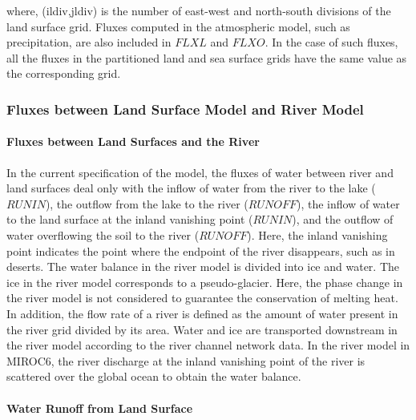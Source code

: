 where, (ildiv,jldiv) is the number of east-west and north-south divisions of the land surface grid. Fluxes computed in the atmospheric model, such as precipitation, are also included in \(FLXL\) and
\(FLXO\). In the case of such fluxes, all the fluxes in the partitioned land and sea surface grids have the same value as the corresponding grid.

\hypertarget{fluxes-between-land-surface-model-and-river-model}{%
\subsubsection{Fluxes between Land Surface Model and River Model}\label{fluxes-between-land-surface-model-and-river-model}}

\hypertarget{fluxes-between-land-surfaces-and-the-river}{%
\paragraph{Fluxes between Land Surfaces and the River}\label{fluxes-between-land-surfaces-and-the-river}}

In the current specification of the model, the fluxes of water between river and land surfaces deal only with the inflow of water from the river to the lake (\(RUNIN\)), the outflow from the lake to
the river (\(RUNOFF\)), the inflow of water to the land surface at the inland vanishing point (\(RUNIN\)), and the outflow of water overflowing the soil to the river (\(RUNOFF\)). Here, the inland
vanishing point indicates the point where the endpoint of the river disappears, such as in deserts. The water balance in the river model is divided into ice and water. The ice in the river model
corresponds to a pseudo-glacier. Here, the phase change in the river model is not considered to guarantee the conservation of melting heat. In addition, the flow rate of a river is defined as the
amount of water present in the river grid divided by its area. Water and ice are transported downstream in the river model according to the river channel network data. In the river model in MIROC6,
the river discharge at the inland vanishing point of the river is scattered over the global ocean to obtain the water balance.

\hypertarget{water-runoff-from-land-surface}{%
\paragraph{Water Runoff from Land Surface}\label{water-runoff-from-land-surface}}


